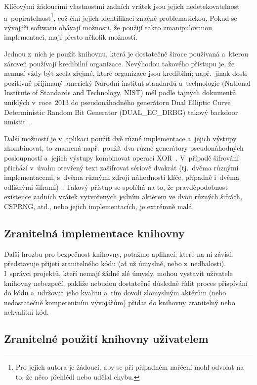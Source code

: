 Klíčovými žádoucími vlastnostmi zadních vrátek jsou jejich nedetekovatelnost a~popiratelnost\footnote{Pro jejich autora je žádoucí, aby se při případném nařčení mohl odvolat na to, že něco přehlédl nebo udělal chybu.}, což činí jejich identifikaci značně problematickou. Pokud se vývojáři softwaru obávají možnosti, že použijí takto zmanipulovanou implementaci, mají přesto několik možností.

Jednou z~nich je použít knihovnu, která je dostatečně široce používaná a~kterou zároveň používají kredibilní organizace. Nevýhodou takového přístupu je, že nemusí vždy být zcela zřejmé, které organizace jsou kredibilní; např.\ jinak dosti pozitivně přijímaný americký Národní institut standardů a~technologie (National Institute of Standards and Technology, NIST) měl podle tajných dokumentů uniklých v~roce~2013 do pseudonáhodného generátoru Dual Elliptic Curve Deterministic Random Bit Generator (DUAL\_EC\_DRBG) takový backdoor umístit~\cite{crypto-backdoors}.

Další možností je v~aplikaci použít dvě různé implementace a~jejich výstupy zkombinovat, to znamená např.\ použít dva různé generátory pseudonáhodných posloupností a~jejich výstupy kombinovat operací XOR~\cite{crypto-backdoors}. V~případě šifrování přichází v~úvahu otevřený text zašifrovat sériově dvakrát (tj.~dvěma různými implementacemi, s~dvěma různými zdroji náhodnosti klíče, případně i~dvěma odlišnými šiframi)~\cite{snowden2019permanent}. Takový přístup se spoléhá na to, že pravděpodobnost existence zadních vrátek vytvořených jedním aktérem ve dvou různých šifrách, CSPRNG, atd., nebo jejich implementacích, je extrémně malá.

\subsection{Zranitelná implementace knihovny}
\label{zranitelna-impl}

Další hrozbu pro bezpečnost knihovny, potažmo aplikací, které na ní závisí, představuje přijetí zranitelného kódu (ať už úmyslně, nebo z~nedbalosti). I~správci projektů, kteří nemají žádné zlé úmysly, mohou vystavit uživatele knihovny nebezpečí, pakliže nebudou dostatečně důsledně řídit proces přispívání do kódu a~udržovat jeho kvalitu a~tím dovolí zlomyslným aktérům (nebo nedostatečně kompetentním vývojářům) přidat do knihovny zranitelný nebo nekvalitní kód.

\subsection{Zranitelné použití knihovny uživatelem}

